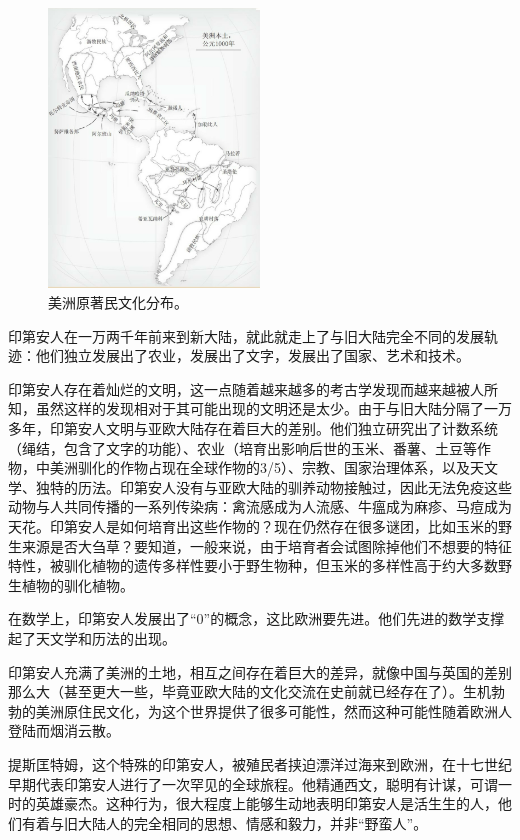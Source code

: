 \begin{figure}[htpb]
\centering
\includegraphics[width=0.5\textwidth]{images/ida-map.jpg}
\caption{美洲原著民文化分布。}
\end{figure}

印第安人在一万两千年前来到新大陆，就此就走上了与旧大陆完全不同的发展轨迹：他们独立发展出了农业，发展出了文字，发展出了国家、艺术和技术。

印第安人存在着灿烂的文明，这一点随着越来越多的考古学发现而越来越被人所知，虽然这样的发现相对于其可能出现的文明还是太少。由于与旧大陆分隔了一万多年，印第安人文明与亚欧大陆存在着巨大的差别。他们独立研究出了计数系统（绳结，包含了文字的功能）、农业（培育出影响后世的玉米、番薯、土豆等作物，中美洲驯化的作物占现在全球作物的3/5）、宗教、国家治理体系，以及天文学、独特的历法。印第安人没有与亚欧大陆的驯养动物接触过，因此无法免疫这些动物与人共同传播的一系列传染病：禽流感成为人流感、牛瘟成为麻疹、马痘成为天花。印第安人是如何培育出这些作物的？现在仍然存在很多谜团，比如玉米的野生来源是否大刍草？要知道，一般来说，由于培育者会试图除掉他们不想要的特征特性，被驯化植物的遗传多样性要小于野生物种，但玉米的多样性高于约大多数野生植物的驯化植物。

在数学上，印第安人发展出了“0”的概念，这比欧洲要先进。他们先进的数学支撑起了天文学和历法的出现。

印第安人充满了美洲的土地，相互之间存在着巨大的差异，就像中国与英国的差别那么大（甚至更大一些，毕竟亚欧大陆的文化交流在史前就已经存在了）。生机勃勃的美洲原住民文化，为这个世界提供了很多可能性，然而这种可能性随着欧洲人登陆而烟消云散。

提斯匡特姆，这个特殊的印第安人，被殖民者挟迫漂洋过海来到欧洲，在十七世纪早期代表印第安人进行了一次罕见的全球旅程。他精通西文，聪明有计谋，可谓一时的英雄豪杰。这种行为，很大程度上能够生动地表明印第安人是活生生的人，他们有着与旧大陆人的完全相同的思想、情感和毅力，并非“野蛮人”。

